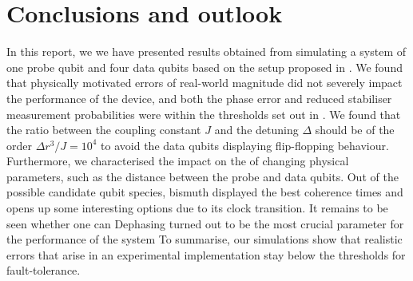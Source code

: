 
\section{Conclusions and outlook } \label{sec:conclusions}
In this report, we we have presented results obtained from simulating a system of one probe qubit and four data qubits based on the setup proposed in \cite{the paper}. We found that physically motivated errors of real-world magnitude did not severely impact the performance of the device, and both the phase error and reduced stabiliser measurement probabilities were within the thresholds set out in \cite{the paper!!}. We found that the ratio between the coupling constant $J$ and the detuning $\Delta$ should be of the order $\Delta r^3/J = 10^4$ to avoid the data qubits displaying flip-flopping behaviour. Furthermore, we characterised the impact on the of changing physical parameters, such as the distance between the probe and data qubits. Out of the possible candidate qubit species, bismuth displayed the best coherence times and opens up some interesting options due to its clock transition. It remains to be seen whether one can Dephasing turned out to be the most crucial parameter for the performance of the system To summarise, our simulations show that realistic errors that arise in an experimental implementation stay below the thresholds for fault-tolerance. 


